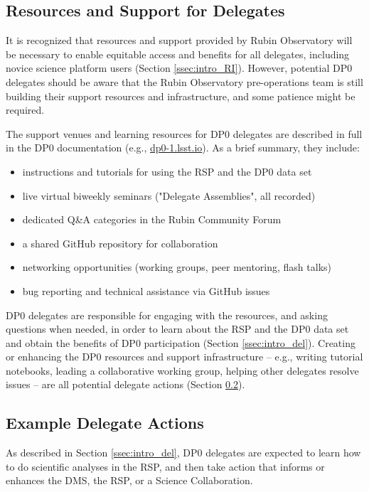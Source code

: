 \documentclass[DM,lsstdraft,authoryear,toc]{lsstdoc}
\begin{document}
\subsection{Resources and Support for Delegates}\label{ssec:res_sup}

It is recognized that resources and support provided by Rubin Observatory will be necessary to enable equitable access and benefits for all delegates, including novice science platform users (Section \ref{ssec:intro_RI}). 
However, potential DP0 delegates should be aware that the Rubin Observatory pre-operations team is still building their support resources and infrastructure, and some patience might be required. 

The support venues and learning resources for DP0 delegates are described in full in the DP0 documentation (e.g., \url{dp0-1.lsst.io}). As a brief summary, they include:
\begin{itemize}
\item instructions and tutorials for using the RSP and the DP0 data set
\item live virtual biweekly seminars ("Delegate Assemblies", all recorded)
\item dedicated Q\&A categories in the Rubin Community Forum
\item a shared GitHub repository for collaboration
\item networking opportunities (working groups, peer mentoring, flash talks)
\item bug reporting and technical assistance via GitHub issues
\end{itemize}

DP0 delegates are responsible for engaging with the resources, and asking questions when needed, in order to learn about the RSP and the DP0 data set and obtain the benefits of DP0 participation (Section \ref{ssec:intro_del}).
Creating or enhancing the DP0 resources and support infrastructure -- e.g., writing tutorial notebooks, leading a collaborative working group, helping other delegates resolve issues -- are all potential delegate actions (Section \ref{ssec:res_act}).


\subsection{Example Delegate Actions}\label{ssec:res_act}

As described in Section \ref{ssec:intro_del}, DP0 delegates are expected to learn how to do scientific analyses in the RSP, and then take action that informs or enhances the DMS, the RSP, or a Science Collaboration. 
\end{document}
